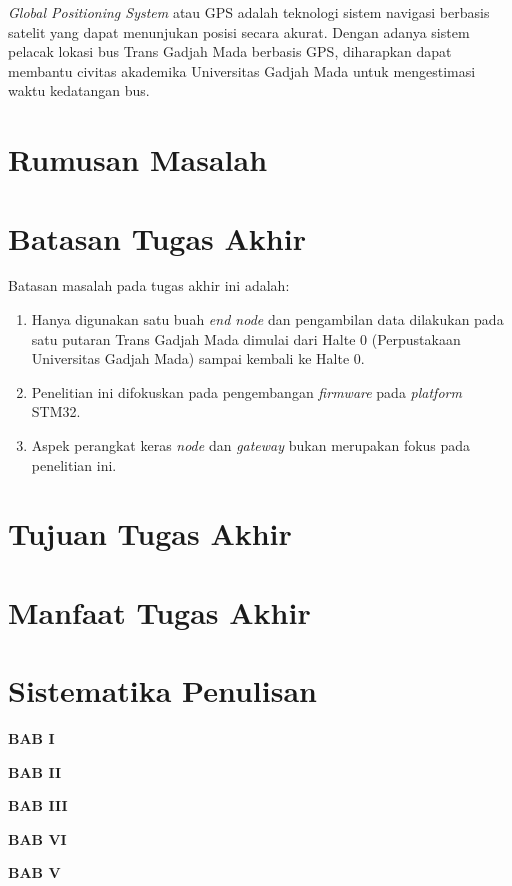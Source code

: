 \textit{Global Positioning System} atau GPS adalah teknologi sistem navigasi berbasis satelit yang dapat menunjukan posisi secara akurat. Dengan adanya sistem pelacak lokasi bus Trans Gadjah Mada berbasis GPS, diharapkan dapat membantu civitas akademika Universitas Gadjah Mada untuk mengestimasi waktu kedatangan bus.

\section{Rumusan Masalah}
\section{Batasan Tugas Akhir}
Batasan masalah pada tugas akhir ini adalah:
\begin{enumerate}
	\item Hanya digunakan satu buah \textit{end node} dan pengambilan data dilakukan pada satu putaran Trans Gadjah Mada dimulai dari Halte 0 (Perpustakaan Universitas Gadjah Mada) sampai kembali ke Halte 0.
	\item Penelitian ini difokuskan pada pengembangan \textit{firmware} pada \textit{platform} STM32.
	\item Aspek perangkat keras \textit{node} dan \textit{gateway} bukan merupakan fokus pada penelitian ini.
\end{enumerate}
\section{Tujuan Tugas Akhir}
\section{Manfaat Tugas Akhir}
\section{Sistematika Penulisan}
\textbf{BAB I}

\textbf{BAB II}

\textbf{BAB III}

\textbf{BAB VI}

\textbf{BAB V}